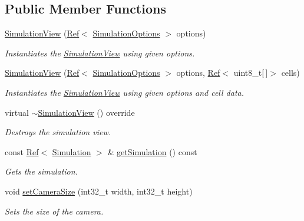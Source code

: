 \subsection*{Public Member Functions}
\begin{DoxyCompactItemize}
\item 
\mbox{\hyperlink{class_simulation_view_a2a540299f494c98c8b5bd61bfa0df420}{Simulation\+View}} (\mbox{\hyperlink{class_ref}{Ref}}$<$ \mbox{\hyperlink{class_simulation_options}{Simulation\+Options}} $>$ options)
\begin{DoxyCompactList}\small\item\em Instantiates the \mbox{\hyperlink{class_simulation_view}{Simulation\+View}} using given options. \end{DoxyCompactList}\item 
\mbox{\hyperlink{class_simulation_view_aecea878e3f70e00c9d618ec939ebaf7e}{Simulation\+View}} (\mbox{\hyperlink{class_ref}{Ref}}$<$ \mbox{\hyperlink{class_simulation_options}{Simulation\+Options}} $>$ options, \mbox{\hyperlink{class_ref}{Ref}}$<$ uint8\+\_\+t\mbox{[}$\,$\mbox{]}$>$ cells)
\begin{DoxyCompactList}\small\item\em Instantiates the \mbox{\hyperlink{class_simulation_view}{Simulation\+View}} using given options and cell data. \end{DoxyCompactList}\item 
virtual \mbox{\hyperlink{class_simulation_view_ad10f4de06a743fb8919f2be1e6585210}{$\sim$\+Simulation\+View}} () override
\begin{DoxyCompactList}\small\item\em Destroys the simulation view. \end{DoxyCompactList}\item 
const \mbox{\hyperlink{class_ref}{Ref}}$<$ \mbox{\hyperlink{class_simulation}{Simulation}} $>$ \& \mbox{\hyperlink{class_simulation_view_a3a1483e1750ad6251ea1cff1f39dcefa}{get\+Simulation}} () const
\begin{DoxyCompactList}\small\item\em Gets the simulation. \end{DoxyCompactList}\item 
void \mbox{\hyperlink{class_simulation_view_a5b0c0ffd8978f7841286be2d06483914}{set\+Camera\+Size}} (int32\+\_\+t width, int32\+\_\+t height)
\begin{DoxyCompactList}\small\item\em Sets the size of the camera. \end{DoxyCompactList}\item 

\end{DoxyCompactItemize}

